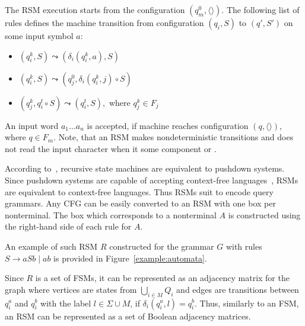 The RSM execution starts from the configuration $(q_m^0, \langle\rangle)$.
The following list of rules defines the machine transition from configuration $(q_i,S)$ to $(q',S')$ on some input symbol $a$:
\begin{itemize}
    \item $(q_i^k,S) \leadsto (\delta_i (q_i^k, a),S)$
    \item $(q_i^k,S) \leadsto (q_j^0, \delta_i (q_i^k, j) \circ S)$
    \item $(q_j^k,q_i^t\circ S) \leadsto (q_i^t, S),$ where $q_j^k \in F_j$
\end{itemize}

An input word $a_1 \dots a_n$ is accepted, if machine reaches configuration $(q,\langle\rangle)$, where $q \in F_m$.
Note, that an RSM makes nondeterministic transitions and does not read the input character when it  some component or .

According to~\cite{rsm:analysis:10.1007/3-540-44585-4_18}, recursive state machines are equivalent to pushdown systems.
Since pushdown systems are capable of accepting context-free languages~\cite{automata:theory:10.5555/1177300}, RSMs are equivalent to context-free languages.
Thus RSMs suit to encode query grammars.
Any CFG can be easily converted to an RSM with one box per nonterminal.
The box which corresponds to a nonterminal $A$ is constructed using the right-hand side of each rule for $A$.

An example of such RSM $R$ constructed for the grammar $G$ with rules $S \to a S b \mid a b$ is provided in Figure~\ref{example:automata}.


Since $R$ is a set of FSMs, it can be represented as an adjacency matrix for the graph where vertices are states from $\bigcup_{i \in M}Q_i$ and edges are transitions between $q_i^a$ and $q_i^b$ with the label $l \in \Sigma \cup M$, if $\delta_i (q_i^a, l) = q_i^b$.
Thus, similarly to an FSM, an RSM can be represented as a set of Boolean adjacency matrices.

